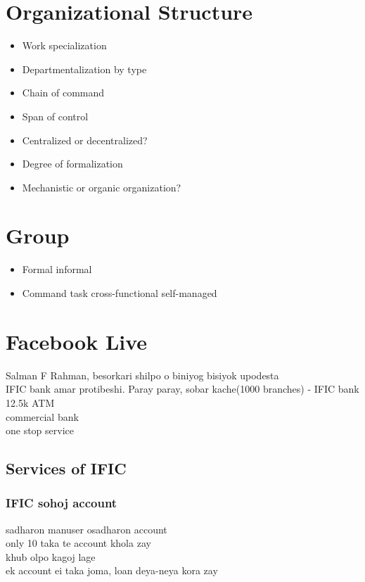 \documentclass[11pt]{article}
\begin{document}
\section{Organizational Structure}
\label{sec:orge7556bd}
\begin{itemize}
\item Work specialization\\
\item Departmentalization by type\\
\item Chain of command\\
\item Span of control\\
\item Centralized or decentralized?\\
\item Degree of formalization\\
\item Mechanistic or organic organization?\\
\end{itemize}
\section{Group}
\label{sec:org35449dc}
\begin{itemize}
\item Formal informal\\
\item Command task cross-functional self-managed\\
\end{itemize}
\section{Facebook Live}
\label{sec:org0a9b85e}
Salman F Rahman, besorkari shilpo o biniyog bisiyok upodesta\\

IFIC bank amar protibeshi. Paray paray, sobar kache(1000 branches) - IFIC bank\\
12.5k ATM\\
commercial bank\\
one stop service\\
\subsection{Services of IFIC}
\label{sec:org1c46e57}
\subsubsection{IFIC sohoj account}
\label{sec:org8b38282}
sadharon manuser osadharon account\\
only 10 taka te account khola zay\\
khub olpo kagoj lage\\
ek account ei taka joma, loan deya-neya kora zay\\
\end{document}
